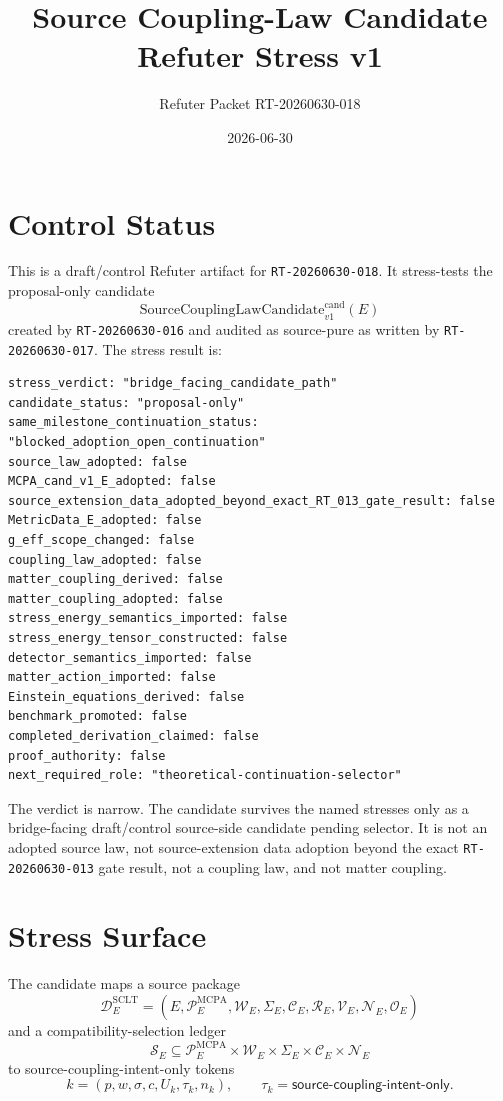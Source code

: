 \documentclass[11pt]{article}
\title{Source Coupling-Law Candidate Refuter Stress v1}
\author{Refuter Packet RT-20260630-018}
\date{2026-06-30}
\newcommand{\SourceCoupCand}{\mathrm{SourceCouplingLawCandidate}^{\mathrm{cand}}_{v1}}
\begin{document}
\maketitle

\section{Control Status}

This is a draft/control Refuter artifact for \texttt{RT-20260630-018}. It
stress-tests the proposal-only candidate
\[
  \SourceCoupCand(E)
\]
created by \texttt{RT-20260630-016} and audited as source-pure as written by
\texttt{RT-20260630-017}. The stress result is:

\begin{verbatim}
stress_verdict: "bridge_facing_candidate_path"
candidate_status: "proposal-only"
same_milestone_continuation_status: "blocked_adoption_open_continuation"
source_law_adopted: false
MCPA_cand_v1_E_adopted: false
source_extension_data_adopted_beyond_exact_RT_013_gate_result: false
MetricData_E_adopted: false
g_eff_scope_changed: false
coupling_law_adopted: false
matter_coupling_derived: false
matter_coupling_adopted: false
stress_energy_semantics_imported: false
stress_energy_tensor_constructed: false
detector_semantics_imported: false
matter_action_imported: false
Einstein_equations_derived: false
benchmark_promoted: false
completed_derivation_claimed: false
proof_authority: false
next_required_role: "theoretical-continuation-selector"
\end{verbatim}

The verdict is narrow. The candidate survives the named stresses only as a
bridge-facing draft/control source-side candidate pending selector. It is not
an adopted source law, not source-extension data adoption beyond the exact
\texttt{RT-20260630-013} gate result, not a coupling law, and not matter
coupling.

\section{Stress Surface}

The candidate maps a source package
\[
  \mathcal{D}^{\mathrm{SCLT}}_E =
  (E,\mathcal{P}^{\mathrm{MCPA}}_E,\mathcal{W}_E,\Sigma_E,
  \mathcal{C}_E,\mathcal{R}_E,\mathcal{V}_E,\mathcal{N}_E,\mathcal{O}_E)
\]
and a compatibility-selection ledger
\[
  \mathcal{S}_E \subseteq
  \mathcal{P}^{\mathrm{MCPA}}_E \times \mathcal{W}_E \times
  \Sigma_E \times \mathcal{C}_E \times \mathcal{N}_E
\]
to source-coupling-intent-only tokens
\[
  k=(p,w,\sigma,c,U_k,\tau_k,n_k),
  \qquad
  \tau_k=\mathsf{source\text{-}coupling\text{-}intent\text{-}only}.
\]
\end{document}
